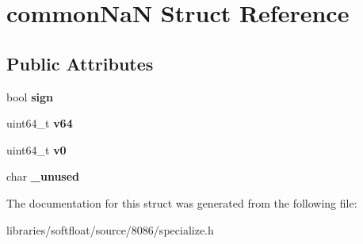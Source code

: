 \hypertarget{structcommon_na_n}{}\section{common\+NaN Struct Reference}
\label{structcommon_na_n}
\subsection*{Public Attributes}
\begin{DoxyCompactItemize}
\item 
\mbox{\label{structcommon_na_n_a32e90937a4ec3878d2620fbafd31a16f}} 
bool {\bfseries sign}
\item 
\mbox{\label{structcommon_na_n_a05124b0293f6d395ce047744b12deff6}} 
uint64\+\_\+t {\bfseries v64}
\item 
\mbox{\label{structcommon_na_n_ad6c4c9c79bcfd2dc2656b599fa5f75a5}} 
uint64\+\_\+t {\bfseries v0}
\item 
\mbox{\label{structcommon_na_n_a03636ad6410b574b28a4f99eb7e4783c}} 
char {\bfseries \+\_\+unused}
\end{DoxyCompactItemize}


The documentation for this struct was generated from the following file\+:\begin{DoxyCompactItemize}
\item 
libraries/softfloat/source/8086/specialize.\+h\end{DoxyCompactItemize}
